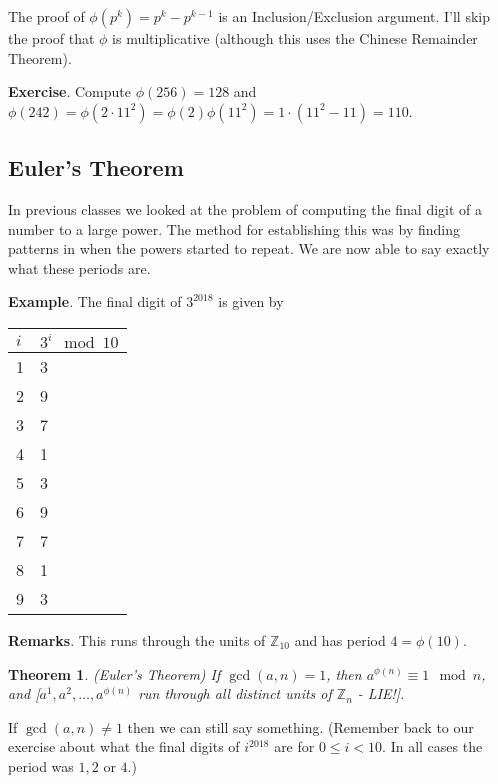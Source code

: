 \documentclass[11pt]{article}
\newtheorem{thm}{Theorem}
\theoremstyle{definition}
\numberwithin{thm}{section}
\begin{document}
The proof of $\phi(p^k) = p^k - p^{k-1}$ is an Inclusion/Exclusion argument. I'll skip the proof that $\phi$ is multiplicative (although this uses the Chinese Remainder Theorem).

\textbf{Exercise}. Compute $\phi(256)=128$ and $\phi(242) = \phi(2 \cdot 11^2) = \phi(2) \phi(11^2) = 1 \cdot (11^2 - 11) = 110$.

\subsection{Euler's Theorem}

In previous classes we looked at the problem of computing the final digit of a number to a large power. The method for establishing this was by finding patterns in when the powers started to repeat. We are now able to say exactly what these periods are.

\textbf{Example}. The final digit of $3^{2018}$ is given by

\begin{table}[!ht]
\begin{tabular}{l|l}
$i$ & $3^i \mod 10$ \\ \hline
1   & 3             \\
2   & 9             \\
3   & 7             \\
4   & 1             \\
5   & 3             \\
6   & 9             \\
7   & 7             \\
8   & 1             \\
9   & 3             \\
\end{tabular}
\end{table}

\textbf{Remarks}. This runs through the units of $\mathbb{Z}_10$ and has period $4 = \phi(10)$.

\begin{thm} (Euler's Theorem) If $\gcd(a,n) = 1$, then $a^{\phi(n)} \equiv 1 \mod n$, and [$a^1, a^2, \ldots, a^{\phi(n)}$ run through all distinct units of $\mathbb{Z}_n$ - LIE!].
\end{thm}

If $\gcd(a,n) \neq 1$ then we can still say something. (Remember back to our exercise about what the final digits of $i^{2018}$ are for $0 \leq i < 10$. In all cases the period was $1,2$ or $4$.)
\end{document}
